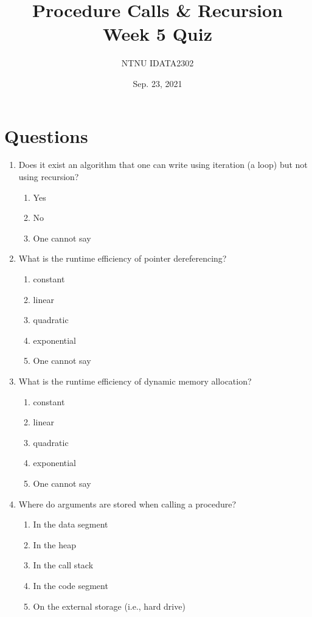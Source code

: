 \documentclass[11pt]{article}
\author{NTNU IDATA2302}
\date{Sep. 23, 2021}
\title{Procedure Calls \& Recursion\\\medskip
\large Week 5 Quiz}
\begin{document}
\maketitle


\section{Questions}
\label{sec:org2dac86f}

\begin{enumerate}
\item Does it exist an algorithm that one can write using iteration (a
loop) but not using recursion?
\begin{enumerate}
\item Yes
\item No
\item One cannot say
\end{enumerate}

\item What is the runtime efficiency of pointer dereferencing?
\begin{enumerate}
\item constant
\item linear
\item quadratic
\item exponential
\item One cannot say
\end{enumerate}

\item What is the runtime efficiency of dynamic memory allocation?
\begin{enumerate}
\item constant
\item linear
\item quadratic
\item exponential
\item One cannot say
\end{enumerate}

\item Where do arguments are stored when calling a procedure?
\begin{enumerate}
\item In the data segment
\item In the heap
\item In the call stack
\item In the code segment
\item On the external storage (i.e., hard drive)
\end{enumerate}


\end{enumerate}
\end{document}
